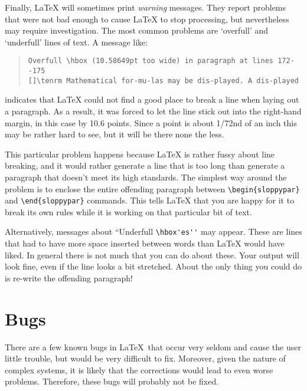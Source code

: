 Finally, \LaTeX{} will sometimes print {\em warning\/} messages.
They report problems that were not bad enough to cause \LaTeX{} to
stop processing, but nevertheless may require investigation.
The most common problems are `overfull' and `underfull' lines of text.
A message like:
\begin{quote}\footnotesize\begin{verbatim}
Overfull \hbox (10.58649pt too wide) in paragraph at lines 172--175
[]\tenrm Mathematical for-mu-las may be dis-played. A dis-played
\end{verbatim}\end{quote}
indicates that \LaTeX{} could not find a good place to break a line
when laying out a paragraph.
As a result, it was forced to let the line stick out into the
right-hand margin, in this case by 10.6 points.
Since a point is about 1/72nd of an inch this may be rather hard to see,
but it will be there none the less.
 
This particular problem happens because \LaTeX{} is rather fussy about
line breaking, and it would rather generate a line that is too long
than generate a paragraph that doesn't meet its high standards.
The simplest way around the
problem is to enclose the entire offending paragraph between
\verb|\begin{sloppypar}| and \verb|\end{sloppypar}| commands.
This tells \LaTeX{} that you are happy for it to break its own rules
while it is working on that particular bit of text.
 
Alternatively, messages about ``Underfull \verb|\hbox'es''| may appear.
These are lines that had to have more space inserted between
words than \LaTeX{} would have liked.
In general there is not much that you can do about these.
Your output will look fine, even if the line looks a bit stretched.
About the only thing you could do is re-write the offending paragraph!
 
\chapter{Bugs}
 
There are a few known bugs in \LaTeX\ that occur very seldom and
cause the user little trouble, but would be very difficult to fix.
Moreover, given the nature of complex systems, it is likely that
the corrections would lead to even worse problems.  Therefore, these
bugs will probably not be fixed.
 
